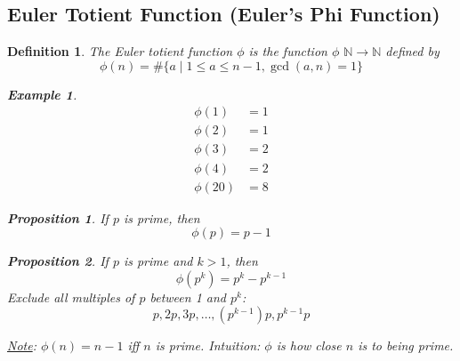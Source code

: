 \documentclass[letterpaper]{article}
\newcommand{\NN}{\mathbb{N}}
\newtheorem{definition}{Definition}[subsection]
\newtheorem{proposition}{Proposition}[subsection]
\newtheorem{example}{Example}[subsection]
\begin{document}
    \subsection{Euler Totient Function (Euler's Phi Function)}
    \begin{definition}
        The Euler totient function $\phi$ is 
        the function $\phi$ $\NN\rightarrow\NN$ defined by 
        \[ 
            \phi(n) = \#\{ a\mid 1\le a\le n-1, \gcd(a,n)=1 \} 
        \]
        \begin{example}
            \begin{align*}
                \phi(1) &= 1 \\
                \phi(2) &= 1 \\
                \phi(3) &= 2 \\
                \phi(4) &= 2 \\
                \phi(20) &= 8
            \end{align*}
        \end{example}

        \begin{proposition}
            If $p$ is prime, then
            \[ \phi(p) = p-1 \]
        \end{proposition}

        \begin{proposition}
            If $p$ is prime and $k>1$, then
            \[ \phi(p^k) = p^k-p^{k-1} \]
            Exclude all multiples of $p$ between 1 and $p^k$:
            \[ p,2p,3p,\dots,(p^{k-1})p,p^{k-1}p \]
        \end{proposition}

        \underline{Note}: $\phi(n)=n-1$ iff $n$ is prime.
        Intuition: $\phi$ is how close $n$ is to being prime.
    \end{definition}
\end{document}
